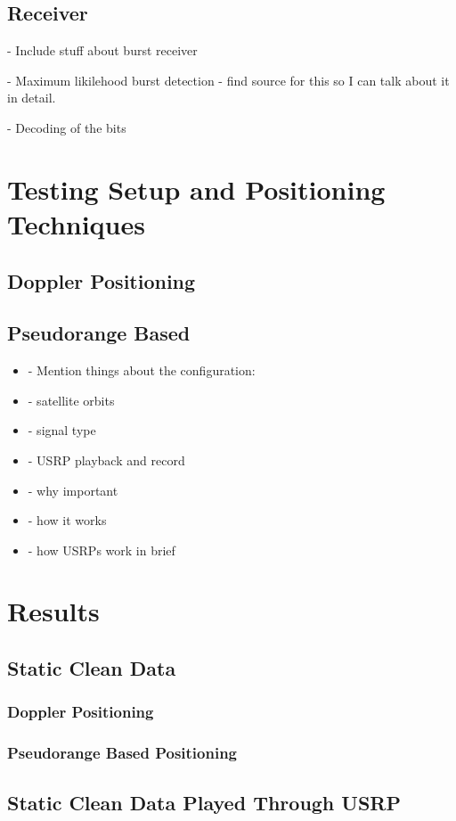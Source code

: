 \documentclass[12pt]{report}
\begin{document}
\section{Receiver}
- Include stuff about burst receiver

- Maximum likilehood burst detection
    - find source for this so I can talk about it in detail.

- Decoding of the bits
 
\chapter{Testing Setup and Positioning Techniques}
\section{Doppler Positioning}
\section{Pseudorange Based}
\begin{itemize}
    \item     - Mention things about the configuration:
    \item     - satellite orbits
    \item     - signal type
    \item     - USRP playback and record
    \item     - why important
    \item     - how it works
    \item     - how USRPs work in brief


\end{itemize}


\chapter{Results}
\section{Static Clean Data}
\subsection{Doppler Positioning}
\subsection{Pseudorange Based Positioning}
\section{Static Clean Data Played Through USRP}
\end{document}
